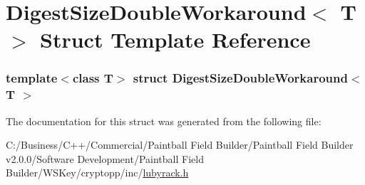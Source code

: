 \hypertarget{struct_digest_size_double_workaround}{
\section{DigestSizeDoubleWorkaround$<$ T $>$ Struct Template Reference}
\label{struct_digest_size_double_workaround}
}
\subsubsection*{template$<$class T$>$ struct DigestSizeDoubleWorkaround$<$ T $>$}



The documentation for this struct was generated from the following file:\begin{DoxyCompactItemize}
\item 
C:/Business/C++/Commercial/Paintball Field Builder/Paintball Field Builder v2.0.0/Software Development/Paintball Field Builder/WSKey/cryptopp/inc/\hyperlink{lubyrack_8h}{lubyrack.h}\end{DoxyCompactItemize}
